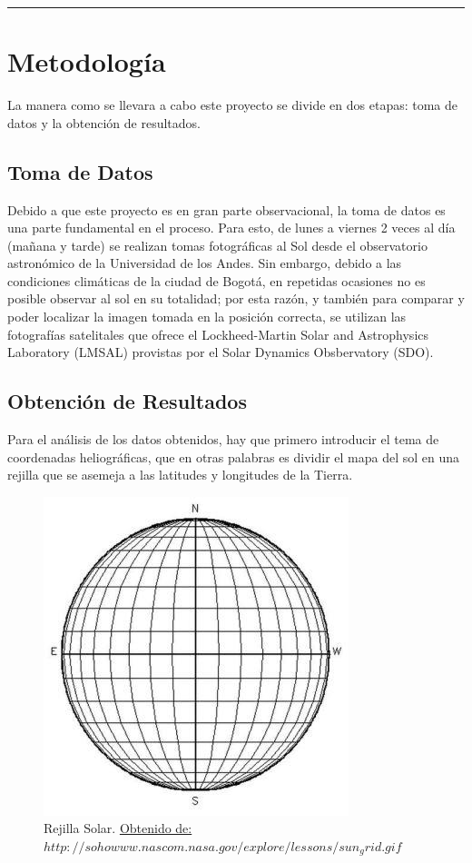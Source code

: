\documentclass[11pt,letterpaper]{article}
\begin{document}
\hrule

\section{Metodología}

La manera como se llevara a cabo este proyecto se divide en dos etapas: toma de datos y la obtención de resultados.\\

\subsection{Toma de Datos}

Debido a que este proyecto es en gran parte observacional, la toma de datos es una parte fundamental en el proceso. Para esto, de lunes a viernes 2 veces al día (mañana y tarde) se realizan tomas fotográficas al Sol desde el observatorio astronómico de la Universidad de los Andes. Sin embargo, debido a las condiciones climáticas de la ciudad de Bogotá, en repetidas ocasiones no es posible observar al sol en su totalidad; por esta razón, y también para comparar y poder localizar la imagen tomada en la posición correcta, se utilizan las fotografías satelitales que ofrece el Lockheed-Martin Solar and Astrophysics Laboratory (LMSAL) provistas por el Solar Dynamics Obsbervatory (SDO).
\\

\subsection{Obtención de Resultados}

Para el análisis de los datos obtenidos, hay que primero introducir el tema de coordenadas heliográficas, que en otras palabras es dividir el mapa del sol en una rejilla que se asemeja a las latitudes y longitudes de la Tierra.
\\

\begin{figure}[h!]
 \centering
 \includegraphics[width=0.7\linewidth]{./grid}
 \caption{Rejilla Solar. \href{http://sohowww.nascom.nasa.gov/explore/lessons/sun_grid.gif}{Obtenido de: $http://sohowww.nascom.nasa.gov/explore/lessons/sun_grid.gif$}}
 \label{fig:grid}
 \end{figure}
 
\end{document}
